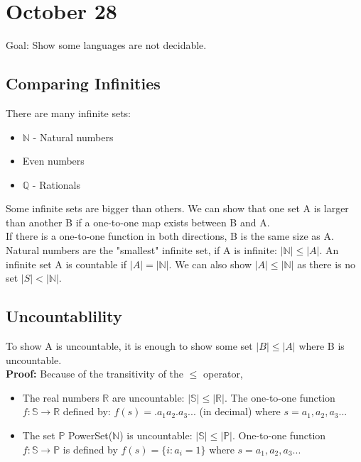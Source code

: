\section{October 28}
Goal: Show some languages are not decidable.
\subsection{Comparing Infinities}
There are many infinite sets:
\begin{itemize}
  \item $\mathbb{N}$ - Natural numbers
  \item Even numbers
  \item $\mathbb{Q}$ - Rationals
\end{itemize}
Some infinite sets are bigger than others. We can show that one set A is larger than another B if a one-to-one map exists between B and A.
\\
If there is a one-to-one function in both directions, B is the same size as A.
\\
Natural numbers are the "smallest" infinite set, if A is infinite: $|\mathbb{N}| \leq |A| $. An infinite set A is countable if $|A| = |\mathbb{N}|$. We can also show $|A| \leq |\mathbb{N}|$ as there is no set $|S| < |\mathbb{N}|$.

\subsection{Uncountablility}
To show A is uncountable, it is enough to show some set $|B| \leq |A|$ where B is uncountable. 
\\
\textbf{Proof:} Because of the transitivity of the $\leq$ operator, 
\begin{itemize}
  \item The real numbers $\mathbb{R}$ are uncountable: $|\mathbb{S}| \leq |\mathbb{R}|$. The one-to-one function $f: \mathbb{S} \to \mathbb{R}$ defined by: $f(s) = .a_1 a_2 .a_3...$ (in decimal) where $s = a_1, a_2, a_3 ...$
  \item The set $\mathbb{P}$ PowerSet($\mathbb{N}$) is uncountable: $|\mathbb{S}| \leq |\mathbb{P}|$. One-to-one function $f: \mathbb{S} \to \mathbb{P}$ is defined by $f(s) = \{i : a_i = 1 \}$ where $s = a_1, a_2, a_3 ...$
\end{itemize}

